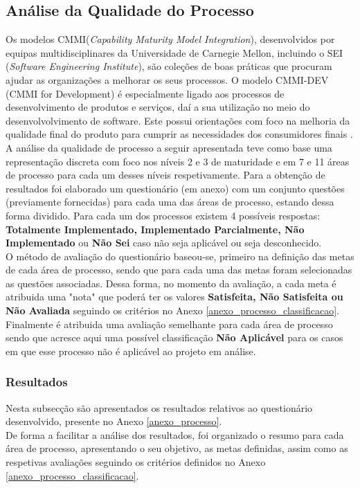 \documentclass[openany,10pt,a4paper]{article}
\begin{document}
\subsection{Análise da Qualidade do Processo}
Os modelos CMMI(\textit{Capability Maturity Model Integration}), desenvolvidos por equipas multidisciplinares da Universidade de Carnegie Mellon, incluindo o SEI (\textit{Software Engineering Institute}), são coleções de boas práticas que procuram ajudar as organizações a melhorar os seus processos. O modelo CMMI-DEV (CMMI for Development) é especialmente ligado aos processos de desenvolvimento de produtos e serviços, daí a sua utilização no meio do desenvolvolvimento de software. Este possui orientações com foco na melhoria da qualidade final do produto para cumprir as necessidades dos consumidores finais \cite{CMMIProductTeam2010}.\\ 
A análise da qualidade de processo a seguir apresentada teve como base uma representação discreta com foco nos níveis 2 e 3 de maturidade e em 7 e 11 áreas de processo para cada um desses níveis respetivamente. Para a obtenção de resultados foi elaborado um questionário (em anexo) com um conjunto questões (previamente fornecidas) para cada uma das áreas de processo, estando dessa forma dividido. Para cada um dos processos existem 4 possíveis respostas:  \textbf{Totalmente Implementado, Implementado Parcialmente, Não Implementado} ou  \textbf{Não Sei} caso não seja aplicável ou seja desconhecido.\\
O método de avaliação do questionário baseou-se, primeiro na definição das metas de cada área de processo, sendo que para cada uma das metas foram selecionadas as questões associadas. Dessa forma, no momento da avaliação, a cada meta é atribuida uma "nota" que poderá ter os valores  \textbf{Satisfeita, Não Satisfeita ou Não Avaliada} seguindo os critérios no Anexo \ref{anexo_processo_classificacao}. Finalmente é atribuida uma avaliação semelhante para cada área de processo sendo que acresce aqui uma possível classificação \textbf{Não Aplicável} para os casos em que esse processo não é aplicável ao projeto em análise.

\subsubsection{Resultados}
Nesta subsecção são apresentados os resultados relativos ao questionário desenvolvido, presente no Anexo \ref{anexo_processo}. \\
De forma a facilitar a análise dos resultados, foi organizado o resumo para cada área de processo, apresentando o seu objetivo, as metas definidas, assim como as respetivas avaliações seguindo os critérios definidos no Anexo \ref{anexo_processo_classificacao}.
\end{document}
